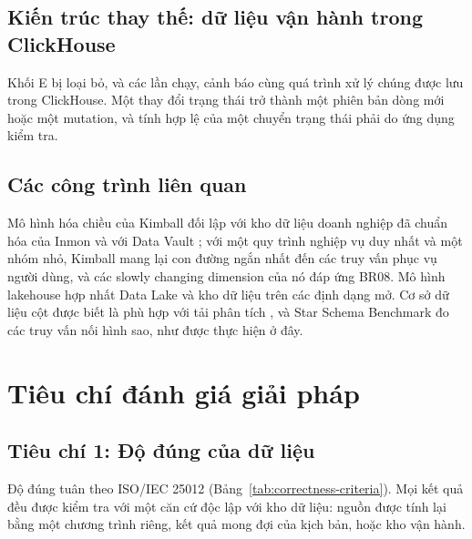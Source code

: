 \documentclass[peerreview]{IEEEtran}
\begin{document}
\subsection{Kiến trúc thay thế: dữ liệu vận hành trong ClickHouse}
\label{sec:sol-ops}
Khối E bị loại bỏ, và các lần chạy, cảnh báo cùng quá trình xử lý chúng được lưu trong
ClickHouse. Một thay đổi trạng thái trở thành một phiên bản dòng mới hoặc một mutation, và
tính hợp lệ của một chuyển trạng thái phải do ứng dụng kiểm tra.

\subsection{Các công trình liên quan}
Mô hình hóa chiều của Kimball \cite{kimball2013} đối lập với kho dữ liệu doanh nghiệp đã
chuẩn hóa của Inmon \cite{inmon2005} và với Data Vault \cite{linstedt2015}; với một quy
trình nghiệp vụ duy nhất và một nhóm nhỏ, Kimball mang lại con đường ngắn nhất đến các truy
vấn phục vụ người dùng, và các slowly changing dimension của nó đáp ứng BR08. Mô hình
lakehouse \cite{armbrust2021lakehouse} hợp nhất Data Lake và kho dữ liệu trên các định dạng
mở. Cơ sở dữ liệu cột được biết là phù hợp với tải phân tích
\cite{stonebraker2005cstore,abadi2008column}, và Star Schema Benchmark \cite{oneil2009ssb}
đo các truy vấn nối hình sao, như được thực hiện ở đây.


\section{Tiêu chí đánh giá giải pháp}
\label{sec:criteria}

\subsection{Tiêu chí 1: Độ đúng của dữ liệu}
Độ đúng tuân theo ISO/IEC 25012 \cite{iso25012} (Bảng~\ref{tab:correctness-criteria}). Mọi
kết quả đều được kiểm tra với một căn cứ độc lập với kho dữ liệu: nguồn được tính lại bằng
một chương trình riêng, kết quả mong đợi của kịch bản, hoặc kho vận hành.
\end{document}

